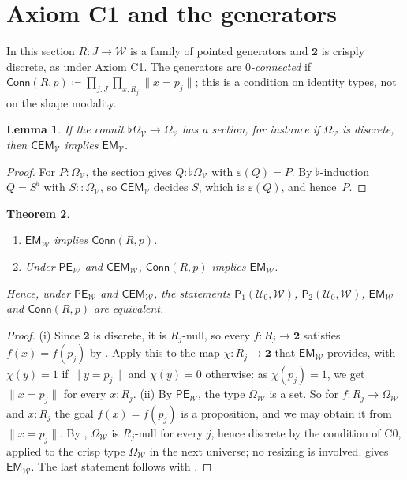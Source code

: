 \documentclass[11pt]{amsart}
\newtheorem{theorem}{Theorem}[section]
\newtheorem{lemma}[theorem]{Lemma}
\theoremstyle{definition}
\theoremstyle{remark}
\newcommand{\V}{\mathcal V}
\newcommand{\W}{\mathcal W}
\newcommand{\Uz}{\mathcal U_0}
\newcommand{\B}{\mathbf 2}
\newcommand{\Om}{\Omega}
\newcommand{\crisp}{\mathrel{::}}
\newcommand{\cu}{\varepsilon}
\newcommand{\fl}[1]{{#1}^{\flat}}
\newcommand{\trunc}[1]{\lVert #1\rVert}
\newcommand{\EM}{\mathsf{EM}}
\newcommand{\CEM}{\mathsf{CEM}}
\newcommand{\PE}{\mathsf{PE}}
\newcommand{\Conn}{\mathsf{Conn}}
\newcommand{\Pone}{\mathsf P_1}
\newcommand{\Ptwo}{\mathsf P_2}
\begin{document}
\section{Axiom C1 and the generators}\label{sec:generators}

In this section $R:J\to\W$ is a family of pointed generators and $\B$ is
crisply discrete, as under Axiom C1. The generators are
\emph{$0$-connected} if $\Conn(R,p)\coloneqq\prod_{j:J}\prod_{x:R_j}
\trunc{x=p_j}$; this is a condition on identity types, not on the shape
modality.

\begin{lemma}\label{lem:omega}
If the counit $\flat\Om_\V\to\Om_\V$ has a section, for instance if
$\Om_\V$ is discrete, then $\CEM_\V$ implies $\EM_\V$.
\end{lemma}

\begin{proof}
For $P:\Om_\V$, the section gives $Q:\flat\Om_\V$ with $\cu(Q)=P$. By
$\flat$-induction $Q=\fl S$ with $S\crisp\Om_\V$, so $\CEM_\V$ decides
$S$, which is $\cu(Q)$, and hence~$P$.
\end{proof}

\begin{theorem}\label{thm:generators}
\leavevmode
\begin{enumerate}[label=(\roman*)]
\item $\EM_\W$ implies $\Conn(R,p)$.
\item Under $\PE_\W$ and $\CEM_\W$, $\Conn(R,p)$ implies $\EM_\W$.
\end{enumerate}
Hence, under $\PE_\W$ and $\CEM_\W$, the statements $\Pone(\Uz,\W)$,
$\Ptwo(\Uz,\W)$, $\EM_\W$ and $\Conn(R,p)$ are equivalent.
\end{theorem}

\begin{proof}
(i) Since $\B$ is discrete, it is $R_j$-null, so every $f:R_j\to\B$
satisfies $f(x)=f(p_j)$ by . Apply this to the map
$\chi:R_j\to\B$ that $\EM_\W$ provides, with $\chi(y)=1$ if
$\trunc{y=p_j}$ and $\chi(y)=0$ otherwise: as $\chi(p_j)=1$, we get
$\trunc{x=p_j}$ for every $x:R_j$.
(ii) By $\PE_\W$, the type $\Om_\W$ is a set. So for $f:R_j\to\Om_\W$
and $x:R_j$ the goal $f(x)=f(p_j)$ is a proposition, and we may obtain it
from $\trunc{x=p_j}$. By , $\Om_\W$ is $R_j$-null for
every $j$, hence discrete by the condition of C0, applied to the crisp
type $\Om_\W$ in the next universe; no resizing is involved.
 gives $\EM_\W$. The last statement follows with
.
\end{proof}
\end{document}
